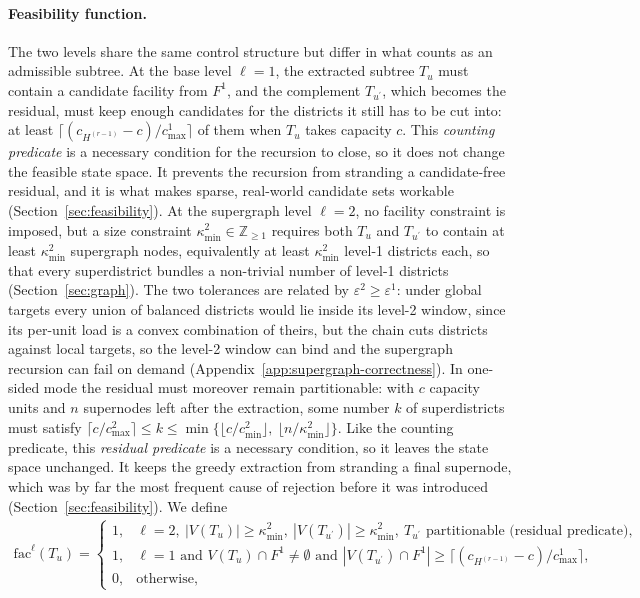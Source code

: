 \documentclass[11pt]{article}
\theoremstyle{definition}
\begin{document}
\paragraph{Feasibility function.}
The two levels share the same control structure but differ in what counts as an admissible subtree. At the base level $\ell =1$, the extracted subtree $T_u$ must contain a candidate facility from $F^1$, and the complement $T_{u^\prime}$, which becomes the residual, must keep enough candidates for the districts it still has to be cut into: at least $\lceil (c_{H^{(r-1)}}-c)/c^{1}_{\max}\rceil$ of them when $T_u$ takes capacity $c$. This \emph{counting predicate} is a necessary condition for the recursion to close, so it does not change the feasible state space. It prevents the recursion from stranding a candidate-free residual, and it is what makes sparse, real-world candidate sets workable (Section~\ref{sec:feasibility}). At the supergraph level $\ell=2$, no facility constraint is imposed, but a size constraint $\kappa^2_{\min} \in \mathbb{Z}_{\geq 1}$ requires both $T_u$ and $T_{u^\prime}$ to contain at least $\kappa^2_{\min}$ supergraph nodes, equivalently at least $\kappa^2_{\min}$ level-1 districts each, so that every superdistrict bundles a non-trivial number of level-1 districts (Section~\ref{sec:graph}). The two tolerances are related by $\varepsilon^{2} \geq \varepsilon^{1}$: under global targets every union of balanced districts would lie inside its level-2 window, since its per-unit load is a convex combination of theirs, but the chain cuts districts against local targets, so the level-2 window can bind and the supergraph recursion can fail on demand (Appendix~\ref{app:supergraph-correctness}). In one-sided mode the residual must moreover remain partitionable: with $c$ capacity units and $n$ supernodes left after the extraction, some number $k$ of superdistricts must satisfy $\lceil c/c^{2}_{\max}\rceil \leq k \leq \min\{\lfloor c/c^{2}_{\min}\rfloor,\ \lfloor n/\kappa^{2}_{\min}\rfloor\}$. Like the counting predicate, this \emph{residual predicate} is a necessary condition, so it leaves the state space unchanged. It keeps the greedy extraction from stranding a final supernode, which was by far the most frequent cause of rejection before it was introduced (Section~\ref{sec:feasibility}). We define
%
\begin{align*}
    \text{fac}^\ell(T_u) =
    \begin{cases}
        1, & \ell = 2,\ |V(T_u)| \geq \kappa^2_{\min},\ |V(T_{u^\prime})| \geq \kappa^2_{\min},\ T_{u^\prime} \text{ partitionable (residual predicate)}, \\
                1, & \ell = 1 \text{ and } V(T_u) \cap F^{1} \neq \emptyset \text{ and } |V(T_{u^\prime}) \cap F^{1}| \geq \bigl\lceil (c_{H^{(r-1)}}-c)/c^{1}_{\max}\bigr\rceil, \\
        0, & \text{otherwise},
    \end{cases}
\end{align*}
\end{document}
